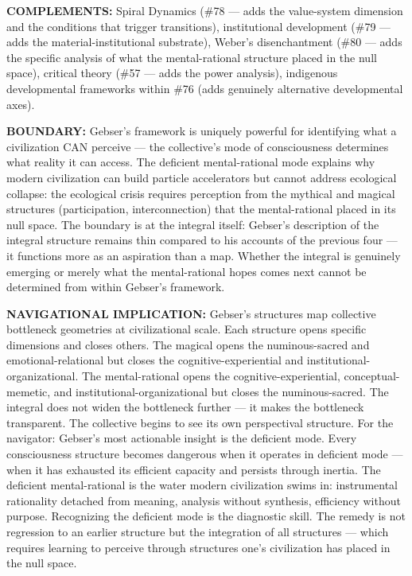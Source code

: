 \textbf{COMPLEMENTS:} Spiral Dynamics (\#78 — adds the value-system dimension and the conditions that trigger transitions), institutional development (\#79 — adds the material-institutional substrate), Weber's disenchantment (\#80 — adds the specific analysis of what the mental-rational structure placed in the null space), critical theory (\#57 — adds the power analysis), indigenous developmental frameworks within \#76 (adds genuinely alternative developmental axes).


\textbf{BOUNDARY:} Gebser's framework is uniquely powerful for identifying what a civilization CAN perceive — the collective's mode of consciousness determines what reality it can access. The deficient mental-rational mode explains why modern civilization can build particle accelerators but cannot address ecological collapse: the ecological crisis requires perception from the mythical and magical structures (participation, interconnection) that the mental-rational placed in its null space. The boundary is at the integral itself: Gebser's description of the integral structure remains thin compared to his accounts of the previous four — it functions more as an aspiration than a map. Whether the integral is genuinely emerging or merely what the mental-rational hopes comes next cannot be determined from within Gebser's framework.


\textbf{NAVIGATIONAL IMPLICATION:} Gebser's structures map collective bottleneck geometries at civilizational scale. Each structure opens specific dimensions and closes others. The magical opens the numinous-sacred and emotional-relational but closes the cognitive-experiential and institutional-organizational. The mental-rational opens the cognitive-experiential, conceptual-memetic, and institutional-organizational but closes the numinous-sacred. The integral does not widen the bottleneck further — it makes the bottleneck transparent. The collective begins to see its own perspectival structure. For the navigator: Gebser's most actionable insight is the deficient mode. Every consciousness structure becomes dangerous when it operates in deficient mode — when it has exhausted its efficient capacity and persists through inertia. The deficient mental-rational is the water modern civilization swims in: instrumental rationality detached from meaning, analysis without synthesis, efficiency without purpose. Recognizing the deficient mode is the diagnostic skill. The remedy is not regression to an earlier structure but the integration of all structures — which requires learning to perceive through structures one's civilization has placed in the null space.


